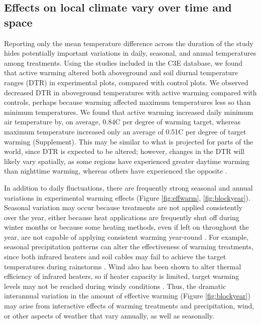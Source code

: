 \documentclass{article}
\begin{document}
\subsection* {Effects on local climate vary over time and space}%
Reporting only the mean temperature difference across the duration of the study hides potentially important variations in daily, seasonal, and annual temperatures among treatments. Using the studies included in the C3E database, we found that active warming altered both aboveground and soil diurnal temperature ranges (DTR) in experimental plots, compared with control plots. We observed decreased DTR in aboveground temperatures with active warming compared with controls, perhaps because warming affected maximum temperatures less so than minimum temperatures. We found that active warming increased daily minimum air temperature by, on average, 0.84\degree C per degree of warming target, whereas maximum temperature increased only an average of 0.51\degree C per degree of target warming (Supplement). This may be similar to what is projected for parts of the world, since DTR is expected to be altered; however, changes in the DTR will likely vary spatially, as some regions have experienced greater daytime warming than nighttime warming, whereas others have experienced the opposite \citep{ipcc2013}. 
\par In addition to daily fluctuations, there are frequently strong seasonal and annual variations in experimental warming effects (Figure \ref{fig:effwarm}, \ref{fig:blockyear}). Seasonal variation may occur because treatments are not applied consistently over the year, either because heat applications are frequently shut off during winter months or because some heating methods, even if left on throughout the year, are not capable of applying consistent warming year-round \citep[e.g.][]{clark2014a,clark2014b,hagedorn2010}. For example, seasonal precipitation patterns can alter the effectiveness of warming treatments, since both infrared heaters and soil cables may fail to achieve the target temperatures during rainstorms \citep{peterjohn1993,hoeppner2012}. Wind also has been shown to alter thermal efficiency of infrared heaters, so if heater capacity is limited, target warming levels may not be reached during windy conditions \citep{kimball2005,kimball2008}. Thus, the dramatic interannual variation in the amount of effective warming (Figure \ref{fig:blockyear}) may arise from interactive effects of warming treatments and precipitation, wind, or other aspects of weather that vary annually, as well as seasonally. 
\end{document}
